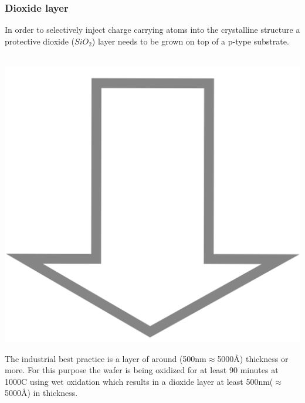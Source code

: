 \subsubsection{Dioxide layer}
In order to selectively inject charge carrying atoms into the crystalline structure a protective dioxide ($SiO_2$) layer needs to be grown on top of a p-type substrate.
\begin{center}
	\begin{tikzpicture}[node distance = 3cm, auto, thick,scale=0.3, every node/.style={transform shape}]
		
	\end{tikzpicture} \\
	\includegraphics[scale=0.01]{down_arrow.png} \\
	\begin{tikzpicture}[node distance = 3cm, auto, thick,scale=0.3, every node/.style={transform shape}]
		
	\end{tikzpicture}
\end{center}
The industrial best practice is a layer of around (500nm$\approx$5000\normalfont\AA) thickness or more.
For this purpose the wafer is being oxidized for at least 90 minutes at 1000\degree C using wet oxidation which results in a dioxide layer at least 500nm($\approx$5000\normalfont\AA) in thickness.

